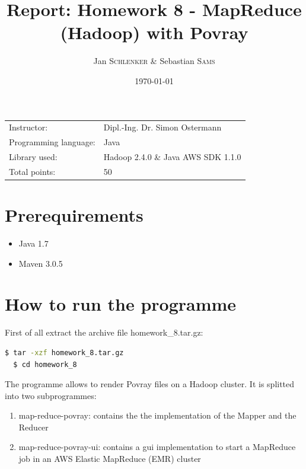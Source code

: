 \documentclass{article}
\title{Report: Homework 8 - MapReduce (Hadoop) with Povray}%
\author{Jan \textsc{Schlenker} \& Sebastian \textsc{Sams}} %
\date{\today} %
\begin{document}
\maketitle %

\begin{center}
\begin{tabular}{l l}
Instructor: & Dipl.-Ing. Dr. Simon Ostermann \\
Programming language: & Java \\
Library used: & Hadoop 2.4.0 \& Java AWS SDK 1.1.0 \\
Total points: & 50 \\
\end{tabular}
\end{center}



\section{Prerequirements}

\begin{itemize}
\item Java 1.7
\item Maven 3.0.5
\end{itemize}

\section{How to run the programme}

First of all extract the archive file homework\_8.tar.gz:

\begin{lstlisting}[language=bash, deletekeywords={cd}]
  $ tar -xzf homework_8.tar.gz
  $ cd homework_8
\end{lstlisting}

The programme allows to render Povray files on a Hadoop cluster.
It is splitted into two subprogrammes:

\begin{enumerate}
\item map-reduce-povray: contains the the implementation of the Mapper and the Reducer
\item map-reduce-povray-ui: contains a gui implementation to start a MapReduce job in an AWS Elastic MapReduce (EMR) cluster
\end{enumerate}
\end{document}
